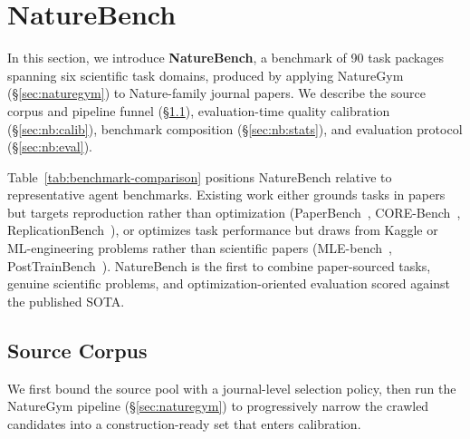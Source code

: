 \section{NatureBench}
\label{sec:naturebench}




In this section, we introduce \textbf{NatureBench}, a benchmark of 90 task packages spanning six scientific task domains, produced by applying NatureGym (\S\ref{sec:naturegym}) to Nature-family journal papers.
We describe the source corpus and pipeline funnel (\S\ref{sec:nb:corpus}), evaluation-time quality calibration (\S\ref{sec:nb:calib}), benchmark composition (\S\ref{sec:nb:stats}), and evaluation protocol (\S\ref{sec:nb:eval}).

Table~\ref{tab:benchmark-comparison} positions NatureBench relative to representative agent benchmarks. Existing work either grounds tasks in papers but targets reproduction rather than optimization (PaperBench~\citep{starace2025paperbench}, CORE-Bench~\citep{siegel2024corebench}, ReplicationBench~\citep{ye2025replicationbench}), or optimizes task performance but draws from Kaggle or ML-engineering problems rather than scientific papers (MLE-bench~\citep{shern2024mlebench}, PostTrainBench~\citep{rank2026posttrainbench}). NatureBench is the first to combine paper-sourced tasks, genuine scientific problems, and optimization-oriented evaluation scored against the published SOTA.

\subsection{Source Corpus}
\label{sec:nb:corpus}

We first bound the source pool with a journal-level selection policy, then run the NatureGym pipeline (\S\ref{sec:naturegym}) to progressively narrow the crawled candidates into a construction-ready set that enters calibration.

